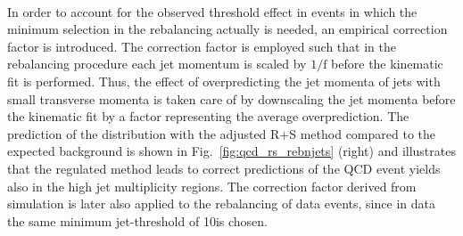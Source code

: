\\
In order to account for the observed threshold effect in events in which the minimum \pt selection in the rebalancing actually is needed, an empirical correction factor is introduced. The correction factor is employed such that in the rebalancing procedure each jet momentum is scaled by $1/\mathrm{f}$ before the kinematic fit is performed. Thus, the effect of overpredicting the jet momenta of jets with small transverse momenta is taken care of by downscaling the jet momenta before the kinematic fit by a factor representing the average overprediction. The prediction of the \NJets distribution with the adjusted R+S method compared to the expected background is shown in Fig.~\ref{fig:qcd_rs_rebnjets} (right) and illustrates that the regulated method leads to correct predictions of the QCD event yields also in the high jet multiplicity regions. The correction factor derived from simulation is later also applied to the rebalancing of data events, since in data the same minimum jet-\pt threshold of 10\gev is chosen.%

